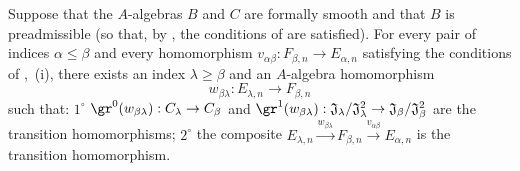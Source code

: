 \begin{lemma}[19.5.6.5]
\label{0.19.5.6.5}
Suppose that the $A$-algebras $B$ and $C$ are formally smooth and that $B$ is preadmissible (so that, by , the conditions of  are satisfied).
For every pair of indices $\alpha\leq\beta$ and every homomorphism
$v_{\alpha\beta}:F_{\beta,n}\to E_{\alpha,n}$ satisfying the conditions of
,~{\rm(i)}, there exists an index $\lambda\geq\beta$ and an
$A$-algebra homomorphism
\[
  w_{\beta\lambda}:E_{\lambda,n}\to F_{\beta,n}
\]
such that:
$1^\circ$ $\gr^0(w_{\beta\lambda}):C_\lambda\to C_\beta$ and
$\gr^1(w_{\beta\lambda}):\mathfrak{J}_\lambda/\mathfrak{J}_\lambda^2
\to\mathfrak{J}_\beta/\mathfrak{J}_\beta^2$ are the transition homomorphisms;
$2^\circ$ the composite
$E_{\lambda,n}\xrightarrow{w_{\beta\lambda}}F_{\beta,n}
\xrightarrow{v_{\alpha\beta}}E_{\alpha,n}$ is the transition homomorphism.
\end{lemma}

